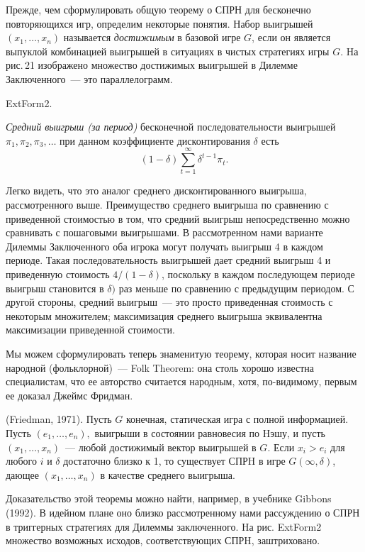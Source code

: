 Прежде, чем сформулировать общую теорему о СПРН для бесконечно
повторяющихся игр, определим некоторые понятия.
Набор выигрышей $(x_1,\ldots,x_n)$ называется {\it достижимым} в
базовой игре $G$, если он является выпуклой комбинацией выигрышей в
ситуациях в чистых стратегиях игры $G$. Hа рис.\,21 изображено
множество достижимых выигрышей в Дилемме Заключенного~--- это
параллелограмм.


ExtForm2.


{\it Средний выигрыш (за период)} бесконечной последовательности
выигрышей $\pi_1,\pi_2,\pi_3,\ldots$ при данном коэффициенте
дисконтирования $\delta$ есть
$$
(1- \delta)\sum^\infty_{t=1}\delta^{t-1}\pi_t.
$$

Легко видеть, что это аналог среднего дисконтированного выигрыша, рассмотренного выше.
Преимущество среднего выигрыша по сравнению с приведенной стоимостью
в том, что средний выигрыш непосредственно можно сравнивать с
пошаговыми выигрышами. В рассмотренном нами варианте Дилеммы
Заключенного оба игрока могут получать выигрыш 4 в каждом периоде.
Такая последовательность выигрышей дает средний выигрыш 4 и
приведенную стоимость $4/(1-\delta)$, поскольку в каждом последующем
периоде выигрыш становится в $\delta)$ раз меньше по сравнению
с предыдущим периодом. С другой стороны, средний
выигрыш~--- это просто приведенная стоимость с некоторым множителем;
максимизация среднего выигрыша эквивалентна максимизации приведенной
стоимости.

Мы можем сформулировать теперь знаменитую теорему, которая носит
название народной (фольклорной)~--- Folk Theorem: она столь
хорошо известна специалистам, что ее авторство считается народным,
хотя, по-видимому, первым ее доказал Джеймс Фридман.

\begin{theorem} {\rm (Friedman, 1971)}. Пусть $G$ конечная,
статическая игра с полной информацией. Пусть $(e_1,\ldots,e_n),$
выигрыши в состоянии равновесия по Hэшу, и пусть
$(x_1,\ldots,x_n)$~--- любой достижимый вектор выигрышей в $G$. Если
$x_i>e_i$ для любого $i$ и $\delta$ достаточно близко к 1, то
существует СПРH в игре $G(\infty,\delta)$, дающее $(x_1,\ldots,x_n)$
в качестве среднего выигрыша.
\end{theorem}

Доказательство этой теоремы можно найти, например, в учебнике Gibbons
(1992). В идейном плане оно близко рассмотренному нами рассуждению
о СПРН в триггерных стратегиях для Дилеммы заключенного.
Hа рис. ExtForm2 множество возможных исходов, соответствующих СПРH,
заштриховано.
\smallskip

